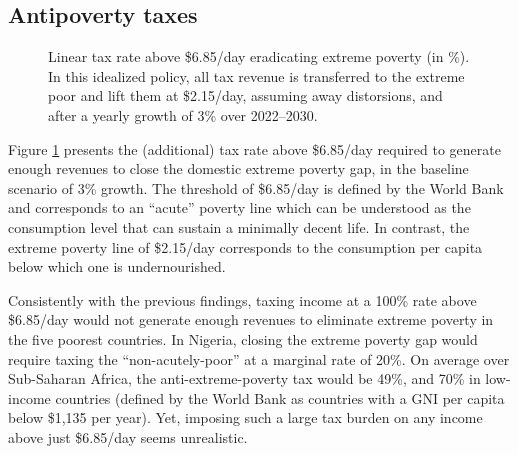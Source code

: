 \subsection{Antipoverty taxes}

\begin{figure}[b!]
  \caption[Anti-extreme-poverty tax above \$6.85/day in 2030 after 3\% growth.]{Linear tax rate above \$6.85/day eradicating extreme poverty (in \%). In this idealized policy, all tax revenue is transferred to the extreme poor and lift them at \$2.15/day, assuming away distorsions, and after a yearly growth of 3\% over 2022--2030. 
  }\label{fig:antipoverty_tax_7}
\end{figure}

Figure \ref{fig:antipoverty_tax_7} presents the (additional) tax rate above \$6.85/day required to generate enough revenues to close the domestic extreme poverty gap, in the baseline scenario of 
3\% growth. The threshold of \$6.85/day is defined by the World Bank and corresponds to an ``acute'' poverty line which can be understood as the consumption level that can sustain a minimally decent life.\cite{hickel_is_2019,kikstra_decent_2021} In contrast, the extreme poverty line of \$2.15/day corresponds to the consumption per capita below which one is undernourished.\cite{allen_absolute_2017} 

Consistently with the previous findings, taxing income at a 100\% rate above \$6.85/day would not generate enough revenues to eliminate extreme poverty in the five poorest countries. In Nigeria, closing the extreme poverty gap would require taxing the ``non-acutely-poor'' at a marginal rate of 20\%. 
On average over Sub-Saharan Africa, the anti-extreme-poverty tax would be 49\%, and 70\% in low-income countries (defined by the World Bank as countries with a GNI per capita below \$1,135 per year). Yet, imposing such a large tax burden on any income above just \$6.85/day seems unrealistic. 


